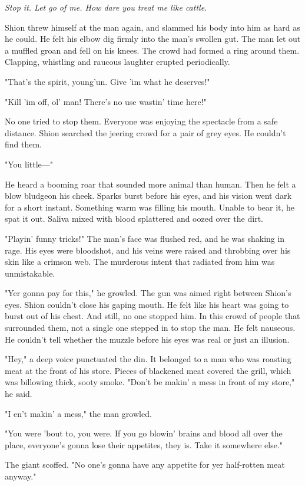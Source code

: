 \emph{Stop it. Let go of me. How dare you treat me like cattle.}

Shion threw himself at the man again, and slammed his body into him as
hard as he could. He felt his elbow dig firmly into the man's swollen
gut. The man let out a muffled groan and fell on his knees. The crowd
had formed a ring around them. Clapping, whistling and raucous laughter
erupted periodically.

"That's the spirit, young'un. Give 'im what he deserves!"

"Kill 'im off, ol' man! There's no use wastin' time here!"

No one tried to stop them. Everyone was enjoying the spectacle from a
safe distance. Shion searched the jeering crowd for a pair of grey eyes.
He couldn't find them.

"You little---"

He heard a booming roar that sounded more animal than human. Then he
felt a blow bludgeon his cheek. Sparks burst before his eyes, and his
vision went dark for a short instant. Something warm was filling his
mouth. Unable to bear it, he spat it out. Saliva mixed with blood
splattered and oozed over the dirt.

"Playin' funny tricks!" The man's face was flushed red, and he was
shaking in rage. His eyes were bloodshot, and his veins were raised and
throbbing over his skin like a crimson web. The murderous intent that
radiated from him was unmistakable.

"Yer gonna pay for this," he growled. The gun was aimed right between
Shion's eyes. Shion couldn't close his gaping mouth. He felt like his
heart was going to burst out of his chest. And still, no one stopped
him. In this crowd of people that surrounded them, not a single one
stepped in to stop the man. He felt nauseous. He couldn't tell whether
the muzzle before his eyes was real or just an illusion.

"Hey," a deep voice punctuated the din. It belonged to a man who was
roasting meat at the front of his store. Pieces of blackened meat
covered the grill, which was billowing thick, sooty smoke. "Don't be
makin' a mess in front of my store," he said.

"I en't makin' a mess," the man growled.

"You were 'bout to, you were. If you go blowin' brains and blood all
over the place, everyone's gonna lose their appetites, they is. Take it
somewhere else."

The giant scoffed. "No one's gonna have any appetite for yer half-rotten
meat anyway."

